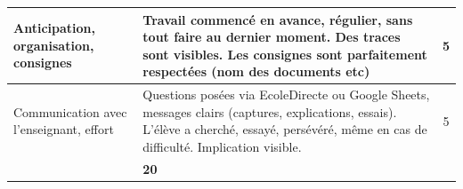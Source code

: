 \documentclass{exam}
\begin{document}
{\begin{longtable}{|L{0.22\textwidth}|L{0.62\textwidth}|c|}
Anticipation, organisation, consignes
& Travail commencé en avance, régulier, sans tout faire au dernier moment. Des traces sont visibles. Les consignes sont parfaitement respectées (nom des documents etc)
& 5 \\
\hline

Communication avec l’enseignant, effort
& Questions posées via EcoleDirecte ou Google Sheets, messages clairs (captures, explications, essais). L’élève a cherché, essayé, persévéré, même en cas de difficulté. Implication visible.
& 5 \\
\hline

 & \textbf{20} \\
\hline

\end{longtable}
}
\end{document}
